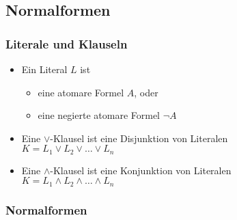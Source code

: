 \documentclass{scrartcl}
\begin{document}
\subsection{Normalformen}

\subsubsection{Literale und Klauseln}

\begin{itemize}
	\item Ein Literal $L$ ist
	\begin{itemize}
		\item eine atomare Formel $A$, oder
		\item eine negierte atomare Formel $\neg A$
	\end{itemize}
	\item Eine $\vee$-Klausel ist eine Disjunktion von Literalen \\
	$K = L_1 \vee L_2 \vee \ldots \vee L_n$
	\item Eine $\wedge$-Klausel ist eine Konjunktion von Literalen \\
	$K = L_1 \wedge L_2 \wedge \ldots \wedge L_n$
\end{itemize}

\subsubsection{Normalformen}
\end{document}

